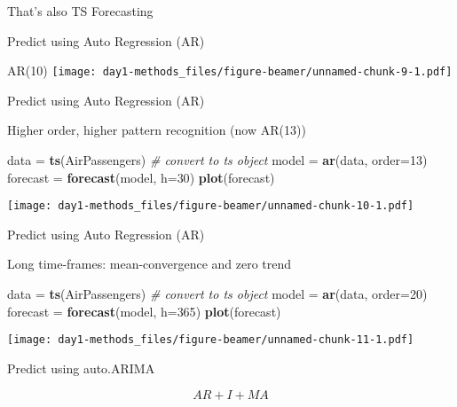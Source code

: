 \documentclass[ignorenonframetext,]{beamer}
\newenvironment{Shaded}{\begin{snugshade}}{\end{snugshade}}
\newcommand{\KeywordTok}[1]{\textcolor[rgb]{0.13,0.29,0.53}{\textbf{#1}}}
\newcommand{\DataTypeTok}[1]{\textcolor[rgb]{0.13,0.29,0.53}{#1}}
\newcommand{\DecValTok}[1]{\textcolor[rgb]{0.00,0.00,0.81}{#1}}
\newcommand{\StringTok}[1]{\textcolor[rgb]{0.31,0.60,0.02}{#1}}
\newcommand{\CommentTok}[1]{\textcolor[rgb]{0.56,0.35,0.01}{\textit{#1}}}
\newcommand{\NormalTok}[1]{#1}
\begin{document}
\begin{frame}[fragile]{That's also TS Forecasting}
\begin{block}{Predict using Auto Regression (AR)}
\begin{block}{AR(10)}
\texttt{[image: day1-methods\_files/figure-beamer/unnamed-chunk-9-1.pdf]}

\end{block}

\end{block}

\begin{block}{Predict using Auto Regression (AR)}

Higher order, higher pattern recognition (now AR(13))

\begin{Shaded}
\begin{Highlighting}[]
\NormalTok{data =}\StringTok{ }\KeywordTok{ts}\NormalTok{(AirPassengers) }\CommentTok{# convert to ts object}
\NormalTok{model =}\StringTok{ }\KeywordTok{ar}\NormalTok{(data, }\DataTypeTok{order=}\DecValTok{13}\NormalTok{)}
\NormalTok{forecast =}\StringTok{ }\KeywordTok{forecast}\NormalTok{(model, }\DataTypeTok{h=}\DecValTok{30}\NormalTok{)}
\KeywordTok{plot}\NormalTok{(forecast)}
\end{Highlighting}
\end{Shaded}

\texttt{[image: day1-methods\_files/figure-beamer/unnamed-chunk-10-1.pdf]}

\end{block}

\begin{block}{Predict using Auto Regression (AR)}

Long time-frames: mean-convergence and zero trend

\begin{Shaded}
\begin{Highlighting}[]
\NormalTok{data =}\StringTok{ }\KeywordTok{ts}\NormalTok{(AirPassengers) }\CommentTok{# convert to ts object}
\NormalTok{model =}\StringTok{ }\KeywordTok{ar}\NormalTok{(data, }\DataTypeTok{order=}\DecValTok{20}\NormalTok{)}
\NormalTok{forecast =}\StringTok{ }\KeywordTok{forecast}\NormalTok{(model, }\DataTypeTok{h=}\DecValTok{365}\NormalTok{)}
\KeywordTok{plot}\NormalTok{(forecast)}
\end{Highlighting}
\end{Shaded}

\texttt{[image: day1-methods\_files/figure-beamer/unnamed-chunk-11-1.pdf]}

\end{block}

\begin{block}{Predict using auto.ARIMA}

\[AR + I + MA\]


\end{block}
\end{frame}
\end{document}

